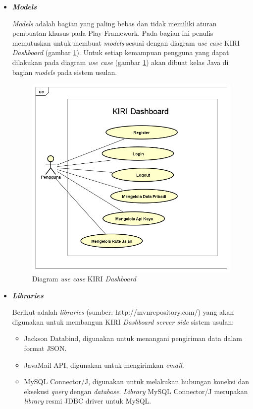 \documentclass[a4paper,twoside]{article}
\begin{document}
\begin{enumerate}
\begin{itemize}
\item \textbf{\textit{Models}}

\textit{Models} adalah bagian yang paling bebas dan tidak memiliki aturan pembuatan khusus pada Play Framework. Pada bagian ini penulis memutuskan untuk membuat \textit{models} sesuai dengan diagram \textit{use case} KIRI \textit{Dashboard} (gambar \ref{fig:3_usecase}). Untuk setiap kemampuan pengguna yang dapat dilakukan pada diagram \textit{use case} (gambar \ref{fig:3_usecase}) akan dibuat kelas Java di bagian \textit{models} pada sistem usulan.

\begin{figure}[htbp]
	\centering
		\includegraphics[scale=0.5]{Gambar/3_usecase.png}
	\caption{Diagram \textit{use case} KIRI \textit{Dashboard}}
	\label{fig:3_usecase}
\end{figure}


\item \textbf{\textit{Libraries}}

Berikut adalah \textit{libraries} (sumber: http://mvnrepository.com/) yang akan digunakan untuk membangun KIRI \textit{Dashboard server side} sistem usulan:
\begin{itemize}
	\item Jackson Databind, digunakan untuk menangani pengiriman data dalam format JSON.
	\item JavaMail API, digunakan untuk mengirimkan \textit{email}.
	\item MySQL Connector/J, digunakan untuk melakukan hubungan koneksi dan eksekusi \textit{query} dengan \textit{database}. \textit{Library} MySQL Connector/J merupakan \textit{library} resmi JDBC driver untuk MySQL.
\end{itemize}
\end{itemize}


\end{enumerate}
\end{document}
